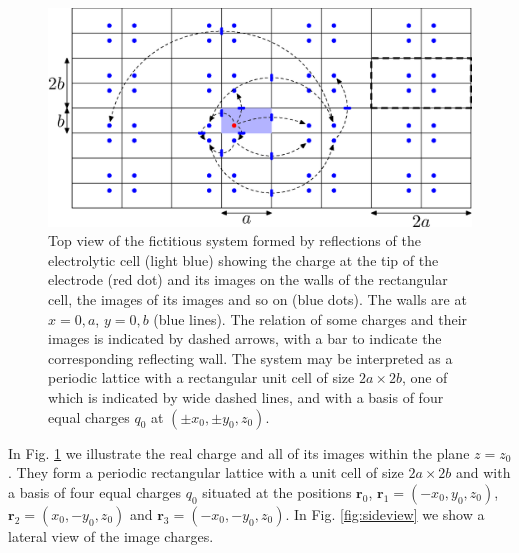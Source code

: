 \documentclass{article}
\begin{document}
\begin{figure}
  \centering
  \includegraphics[width=\textwidth]{paper-1}
  \caption{Top view of the fictitious system formed by reflections of
    the electrolytic cell (light blue) showing the charge at the
    tip of the electrode (red dot) and its images on the walls of the
    rectangular cell, the images of its images and so on (blue
    dots). The walls are at $x=0,a$,
    $y=0,b$ (blue lines). The relation of some charges and their images is
    indicated by dashed arrows, with a bar to indicate the
    corresponding reflecting wall. The system may be interpreted as a
    periodic lattice with a rectangular unit cell of size $2a\times 2b$,
    one of which is indicated  by wide dashed lines, and with a basis of four equal
    charges $q_0$ at $(\pm x_0, \pm y_0, z_0)$.}
  \label{fig:topview}
\end{figure}
In Fig. \ref{fig:topview} we illustrate the real charge and all of
its images within the plane $z=z_0$. They form a periodic rectangular
lattice with a unit cell of size $2a\times 2b$ and with a basis of
four equal charges $q_0$ situated at the positions $\bm r_0$, $\bm
r_1=(-x_0, y_0, z_0)$, $\bm r_2=(x_0, -y_0, z_0)$ and $\bm r_3=(-x_0,
-y_0, z_0)$. In Fig. \ref{fig:sideview} we show a lateral view of the
image charges.
\end{document}
